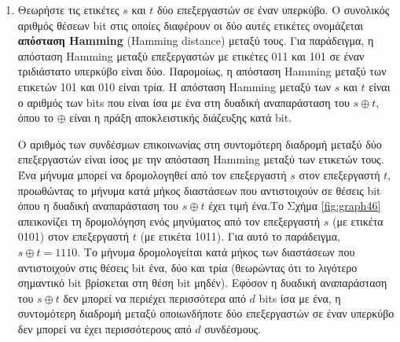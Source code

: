 \documentclass[12pt,a4paper]{article}
\begin{document}
\begin{enumerate}
    Το Σχήμα \ref{fig:graph48} απεικονίζει αυτή την ιδιότητα. Στο σχήμα αυτό, 
    $k=2$ και $d=4$. Οι τέσσερις υπoκύβοι (των τεσσάρων επεξεργαστών ο καθένας) 
    που σχηματίζονται με σταθεροποίηση των δύο σημαντικότερων 
    \foreignlanguage{english}{bits} παρουσιάζονται στο Σχήμα 
    \ref{fig:graph48}(α). Οι υποκύβοι που σχηματίζονται με σταθεροποίηση των 
    δύο λιγότερο σημαντικών \foreignlanguage{english}{bits} παρουσιάζονται 
    στο Σχήμα \ref{fig:graph48}(β).

    \item Θεωρήστε τις ετικέτες $s$ και $t$ δύο επεξεργαστών σε έναν υπερκύβο. 
    Ο συνολικός αριθμός θέσεων \foreignlanguage{english}{bit} στις οποίες 
    διαφέρουν οι δύο αυτές ετικέτες ονομάζεται \textbf{απόσταση \foreignlanguage{english}{Hamming}} 
    (\foreignlanguage{english}{Hamming distance}) μεταξύ τους. Για παράδειγμα, 
    η απόσταση \foreignlanguage{english}{Hamming} μεταξύ επεξεργαστών με 
    ετικέτες 011 και 101 σε έναν τριδιάστατο υπερκύβο είναι δύο. 
    Παρομοίως, η απόσταση \foreignlanguage{english}{Hamming} μεταξύ 
    των ετικετών 101 και 010 είναι τρία. Η απόσταση 
    \foreignlanguage{english}{Hamming} μεταξύ των $s$ και $t$ είναι 
    ο αριθμός των \foreignlanguage{english}{bits} που είναι ίσα με ένα 
    στη δυαδική αναπαράσταση του $s \oplus t$, όπου το $\oplus$ είναι 
    η πράξη αποκλειστικής διάζευξης κατά \foreignlanguage{english}{bit}.

    Ο αριθμός των συνδέσμων επικοινωνίας στη συντομότερη διαδρομή 
    μεταξύ δύο επεξεργαστών είναι ίσος με την απόσταση 
    \foreignlanguage{english}{Hamming} μεταξύ των ετικετών τους. 
    Ένα μήνυμα μπορεί να δρομολογηθεί από τον επεξεργαστή $s$ στον 
    επεξεργαστή $t$, προωθώντας το μήνυμα κατά μήκος διαστάσεων που 
    αντιστοιχούν σε θέσεις \foreignlanguage{english}{bit} όπου η 
    δυαδική αναπαράσταση του $s \oplus t$ έχει τιμή ένα.Το Σχήμα \ref{fig:graph46} 
    απεικονίζει τη δρομολόγηση ενός μηνύματος από τον επεξεργαστή $s$ 
    (με ετικέτα 0101) στον επεξεργαστή $t$ (με ετικέτα 1011). Για αυτό 
    το παράδειγμα, $s \oplus t = 1110$. Το μήνυμα δρομολογείται κατά 
    μήκος των διαστάσεων που αντιστοιχούν στις θέσεις \foreignlanguage{english}{bit} 
    ένα, δύο και τρία (θεωρώντας ότι το λιγότερο σημαντικό 
    \foreignlanguage{english}{bit} βρίσκεται στη θέση \foreignlanguage{english}{bit} 
    μηδέν). Εφόσον η δυαδική αναπαράσταση του $s \oplus t$ δεν μπορεί να 
    περιέχει περισσότερα από $d$ \foreignlanguage{english}{bits} ίσα με 
    ένα, η συντομότερη διαδρομή μεταξύ οποιωνδήποτε δύο επεξεργαστών σε 
    έναν υπερκύβο δεν μπορεί να έχει περισσότερους από $d$ συνδέσμους.
\end{enumerate}
\end{document}
